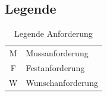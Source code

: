\documentclass{article}
\begin{document}
\begin{landscape}
\begin{longtable}{>{\raggedright\arraybackslash}l>{\raggedright\arraybackslash}l>{\raggedright\arraybackslash}p{4cm}>{\raggedright\arraybackslash}p{15cm}>{\raggedright\arraybackslash}c}
	\end{longtable}
	
	\subsection{Legende}
	\begin{table}[H]
		\centering
		\begin{tabular}{cl}
			M & Mussanforderung   \\
			F & Festanforderung   \\
			W & Wunschanforderung \\
		\end{tabular}
		\caption{Legende Anforderung}
		\label{tab:my_label}
	\end{table}
	 
\end{landscape} %
\end{document}
